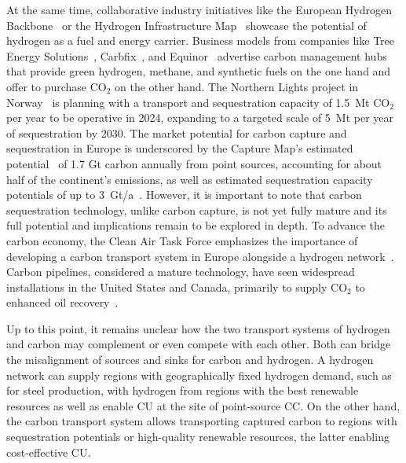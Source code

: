 \documentclass[twocolumn]{article}
\newcommand{\carbon}{CO$_2$}
\begin{document}
At the same time, collaborative industry initiatives like the European Hydrogen Backbone~\cite{gasforclimateEuropeanHydrogenBackbone2022} or the Hydrogen Infrastructure Map~\cite{H2InfrastructureMap} showcase the potential of hydrogen as a fuel and energy carrier.
Business models from companies like Tree Energy Solutions~\cite{TESHydrogenLife2023}, Carbfix~\cite{WeTurnCO2}, and Equinor~\cite{adomaitisEquinorRWEBuild2023} advertise carbon management hubs that provide green hydrogen, methane, and synthetic fuels on the one hand and offer to purchase \carbon{} on the other hand. The Northern Lights project in Norway~\cite{NorthernLightsWhat} is planning with a transport and sequestration capacity of 1.5~Mt \carbon{} per year to be operative in 2024, expanding to a targeted scale of 5~Mt per year of sequestration by 2030.
The market potential for carbon capture and sequestration in Europe is underscored by the Capture Map's estimated potential~\cite{ToolsGreenTransition} of 1.7 Gt carbon annually from point sources, accounting for about half of the continent's emissions, as well as estimated sequestration capacity potentials of up to 3~Gt/a~\cite{europeancommissionEuropeanCO2Storage}. However, it is important to note that carbon sequestration technology, unlike carbon capture, is not yet fully mature and its full potential and implications remain to be explored in depth.
To advance the carbon economy, the Clean Air Task Force emphasizes the importance of developing a carbon transport system in Europe alongside a hydrogen network~\cite{lockwoodEuropeanStrategyCarbon}. Carbon pipelines, considered a mature technology, have seen widespread installations in the United States and Canada, primarily to supply \carbon{} to enhanced oil recovery~\cite{righettiSitingCarbonDioxide2017,friedmannNETZEROGEOSPHERICRETURN}.

Up to this point, it remains unclear how the two transport systems of hydrogen and carbon may complement or even compete with each other. Both can bridge the misalignment of sources and sinks for carbon and hydrogen. A hydrogen network can supply regions with geographically fixed hydrogen demand, such as for steel production, with hydrogen from regions with the best renewable resources as well as enable CU at the site of point-source CC. On the other hand, the carbon transport system allows transporting captured carbon to regions with sequestration potentials or high-quality renewable resources, the latter enabling cost-effective CU.
\end{document}

